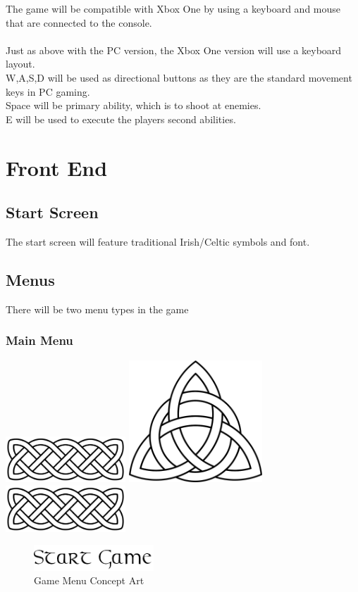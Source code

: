 \documentclass[a4paper]{scrreprt}
\begin{document}
The game will be compatible with Xbox One by using a keyboard and mouse that are connected to the console. \\\\

Just as above with the PC version, the Xbox One version will use a keyboard layout. \\
W,A,S,D will be used as directional buttons as they are the standard movement keys in PC gaming. \\
Space will be primary ability, which is to shoot at enemies. \\
E will be used to execute the players second abilities.

\chapter{Front End}

\section{Start Screen}

The start screen will feature traditional Irish/Celtic symbols and font.

\section{Menus}

There will be two menu types in the game

\subsection{Main Menu}

\begin{center}
\includegraphics[width=4.5cm]{celtic-knot}
\includegraphics[width=5cm]{celtic-knot-arrow}
\includegraphics[width=4.5cm]{celtic-knot}
\begin{figure}[H]
\centering
\includegraphics[width=4.5cm]{start-game}
\caption{\label{fig:art} Game Menu Concept Art}
\end{figure}
\end{center}
\end{document}
